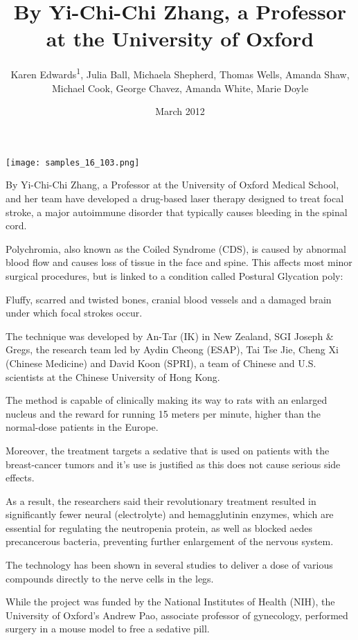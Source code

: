 \documentclass{article}
\title{By Yi-Chi-Chi Zhang, a Professor at the University of Oxford}
\author{Karen Edwards\textsuperscript{1},  Julia Ball,  Michaela Shepherd,  Thomas Wells,  Amanda Shaw,  Michael Cook,  George Chavez,  Amanda White,  Marie Doyle}
\affil{\textsuperscript{1}Columbia University}
\date{March 2012}
\begin{document}
\maketitle

\begin{center}
\begin{minipage}{0.75\linewidth}
\texttt{[image: samples\_16\_103.png]}
\end{minipage}
\end{center}

By Yi-Chi-Chi Zhang, a Professor at the University of Oxford Medical School, and her team have developed a drug-based laser therapy designed to treat focal stroke, a major autoimmune disorder that typically causes bleeding in the spinal cord.

Polychromia, also known as the Coiled Syndrome (CDS), is caused by abnormal blood flow and causes loss of tissue in the face and spine. This affects most minor surgical procedures, but is linked to a condition called Postural Glycation poly:

Fluffy, scarred and twisted bones, cranial blood vessels and a damaged brain under which focal strokes occur.

The technique was developed by An-Tar (IK) in New Zealand, SGI Joseph \& Gregs, the research team led by Aydin Cheong (ESAP), Tai Tse Jie, Cheng Xi (Chinese Medicine) and David Koon (SPRI), a team of Chinese and U.S. scientists at the Chinese University of Hong Kong.

The method is capable of clinically making its way to rats with an enlarged nucleus and the reward for running 15 meters per minute, higher than the normal-dose patients in the Europe.

Moreover, the treatment targets a sedative that is used on patients with the breast-cancer tumors and it’s use is justified as this does not cause serious side effects.

As a result, the researchers said their revolutionary treatment resulted in significantly fewer neural (electrolyte) and hemagglutinin enzymes, which are essential for regulating the neutropenia protein, as well as blocked aedes precancerous bacteria, preventing further enlargement of the nervous system.

The technology has been shown in several studies to deliver a dose of various compounds directly to the nerve cells in the legs.

While the project was funded by the National Institutes of Health (NIH), the University of Oxford’s Andrew Pao, associate professor of gynecology, performed surgery in a mouse model to free a sedative pill.
\end{document}
